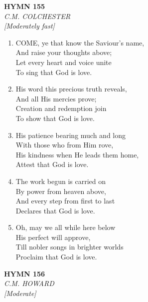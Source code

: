 \documentclass[11pt,a4paper]{article}
\begin{document}
\newpage
\begin{center}
    {\Large \textbf{HYMN 155}}
    \\
    \textit{C.M. COLCHESTER}
    \\
    \textit{\small [Moderately fast]}
\end{center}
\vspace{1em}

\begin{enumerate}
    \item COME, ye that know the Saviour's name, \\
        And raise your thoughts above; \\
        Let every heart and voice unite \\
        To sing that God is love.

    \item His word this precious truth reveals, \\
        And all His mercies prove; \\
        Creation and redemption join \\
        To show that God is love.

    \item His patience bearing much and long \\
        With those who from Him rove, \\
        His kindness when He leads them home, \\
        Attest that God is love.

    \item The work begun is carried on \\
        By power from heaven above, \\
        And every step from first to last \\
        Declares that God is love.

    \item Oh, may we all while here below \\
        His perfect will approve, \\
        Till nobler songs in brighter worlds \\
        Proclaim that God is love.

\end{enumerate}

\newpage
\begin{center}
    {\Large \textbf{HYMN 156}}
    \\
    \textit{C.M. HOWARD}
    \\
    \textit{\small [Moderate]}
\end{center}
\vspace{1em}
\end{document}
